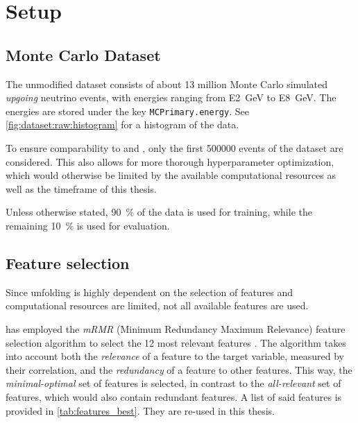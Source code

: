 \section{Setup}

\subsection{Monte Carlo Dataset}
The unmodified dataset \cite{icecube_mc} consists of about 13 million Monte Carlo simulated \emph{upgoing} neutrino events,
with energies ranging from \SI{E2}{\giga\electronvolt} to \SI{E8}{\giga\electronvolt}.
The energies are stored under the key \texttt{MCPrimary.energy}. %
See \autoref{fig:dataset:raw:histogram} for a histogram of the data.

To ensure comparability to \cite{dsea_samuel} and \cite{dsea_jan},
only the first \num{500000} events of the dataset are considered.
This also allows for more thorough hyperparameter optimization,
which would otherwise be limited by the available computational resources as well as the timeframe of this thesis.

Unless otherwise stated, %
\SI{90}{\percent} of the data is used for training,
while the remaining \SI{10}{\percent} is used for evaluation.


\subsection{Feature selection}
Since
  unfolding is highly dependent on the selection of features \citationneeded{}
  and computational resources are limited,
not all available features are used.

\citeauthor{dsea_jan} has employed the \emph{mRMR} (Minimum Redundancy Maximum Relevance) feature selection algorithm \cite{mrmr}
to select the 12 most relevant features \cite{dsea_jan}.
The algorithm takes into account both
  the \emph{relevance} of a feature to the target variable,
    measured by their correlation,
  and the \emph{redundancy} of a feature to other features.
This way,
the \emph{minimal-optimal} set of features is selected,
  in contrast to the \emph{all-relevant} set of features,
    which would also contain redundant features.
A list of said features is provided in \autoref{tab:features_best}.
They are re-used in this thesis.

